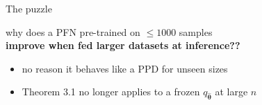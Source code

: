 \documentclass[aspectratio=169,10pt]{beamer}
\newcommand{\gd}[1]{{\color{good}\textbf{#1}}}
\newcommand{\btheta}{\boldsymbol{\theta}}
\begin{document}
\begin{frame}{The puzzle}
\vspace{0.5em}
\begin{center}
  {\Large why does a PFN pre-trained on $\le 1000$ samples\\[0.5em]
   \gd{improve when fed larger datasets at inference??}}
\end{center}
\vfill
\begin{itemize}\setlength\itemsep{0.6em}
  \item no reason it behaves like a PPD for unseen sizes
  \item Theorem 3.1 no longer applies to a frozen $q_{\widehat{\btheta}}$ at large $n$
\end{itemize}
\vfill
\end{frame}

\end{document}
